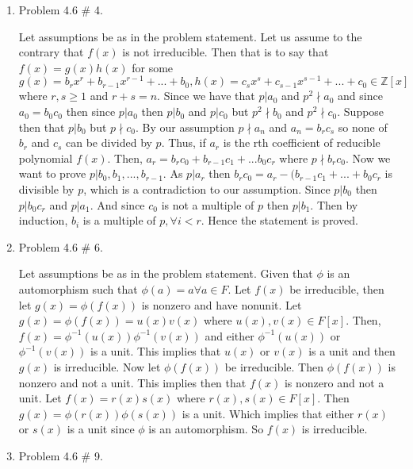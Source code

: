\documentclass[11pt]{article}
\newcommand{\Z}{\mathbb{Z}}
\begin{document}
\begin{enumerate}
\begin{enumerate}
\end{enumerate}

\pagebreak
\item Problem 4.6 \# 4.

Let assumptions be as in the problem statement. Let us assume to the contrary that $f(x)$ is not irreducible. Then that is to say that $f(x) = g(x)h(x)$ for some $g(x)=b_rx^r+b_{r-1}x^{r-1}+...+b_0,h(x)=c_sx^{s}+c_{s-1}x^{s-1}+...+c_0\in\Z[x]$ where $r,s\geq1$ and $r+s=n$. Since we have that $p|a_0$ and $p^2 \nmid a_0$ and since $a_0=b_0c_0$ then since $p|a_0$ then $p|b_0$ and $p|c_0$ but $p^2\nmid b_0$ and $p^2\nmid c_0$. Suppose then that $p|b_0$ but $p\nmid c_0$. By our assumption $p\nmid a_n$ and $a_n=b_rc_s$ so none of $b_r$ and $c_s$ can be divided by $p$. Thus, if $a_r$ is the rth coefficient of reducible polynomial $f(x)$. Then, $a_r = b_rc_0+b_{r-1}c_1+...b_0c_r$ where $p\nmid b_rc_0$. Now we want to prove $p|b_0,b_1,...,b_{r-1}$. As $p|a_r$ then $b_rc_0 = a_r-(b_{r-1}c_1+...+b_0c_r$ is divisible by $p$, which is a contradiction to our assumption. Since $p|b_0$ then $p|b_0c_r$ and $p|a_1$. And since $c_0$ is not a multiple of $p$ then $p|b_1.$ Then by induction, $b_i$ is a multiple of $p, \forall i < r.$ Hence the statement is proved.

\pagebreak
\item Problem 4.6 \# 6.

Let assumptions be as in the problem statement. Given that $\phi$ is an automorphism such that $\phi(a) = a \forall a\in F$. Let $f(x)$ be irreducible, then let $g(x) = \phi(f(x))$ is nonzero and have nonunit. Let $g(x)=\phi(f(x)) = u(x)v(x)$ where $u(x),v(x)\in F[x].$ Then, $f(x) = \phi^{-1}(u(x))\phi^{-1}(v(x))$ and either $\phi^{-1}(u(x))$ or $\phi^{-1}(v(x))$ is a unit. This implies that $u(x)$ or $v(x)$ is a unit and then $g(x)$ is irreducible. Now let $\phi(f(x))$ be irreducible. Then $\phi(f(x))$ is nonzero and not a unit. This implies then that $f(x)$ is nonzero and not a unit. Let $f(x)=r(x)s(x)$ where $r(x),s(x)\in F[x]$. Then $g(x)=\phi(r(x))\phi(s(x))$ is a unit. Which implies that either $r(x)$ or $s(x)$ is a unit since $\phi$ is an automorphism. So $f(x)$ is irreducible.

\pagebreak
\item Problem 4.6 \# 9.


\end{enumerate}
\end{document}
